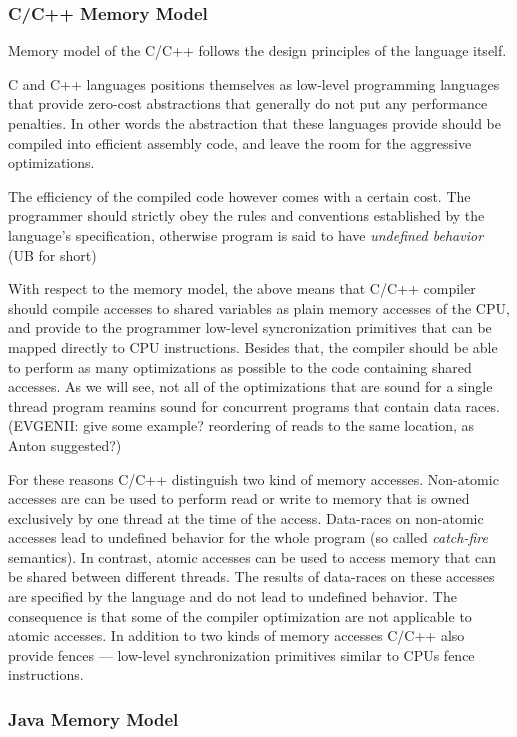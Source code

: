 \documentclass[a4paper,twoside,11pt]{article}
\numberwithin{equation}{section}
\begin{document}
\subsubsection{C/C++ Memory Model}

Memory model of the C/C++ follows the design principles of the language itself.

C and C++ languages positions themselves as low-level programming languages
that provide zero-cost abstractions that generally do not put any performance penalties. 
In other words the abstraction that these languages provide 
should be compiled into efficient assembly code,
and leave the room for the aggressive optimizations.

The efficiency of the compiled code however comes with a certain cost.
The programmer should strictly obey the rules and conventions
established by the language's specification, 
otherwise program is said to have \emph{undefined behavior} (UB for short)

With respect to the memory model, the above means that C/C++ compiler should
compile accesses to shared variables as plain memory accesses of the CPU,
and provide to the programmer low-level syncronization primitives
that can be mapped directly to CPU instructions.
Besides that, the compiler should be able to perform 
as many optimizations as possible to the code containing shared accesses.
As we will see, not all of the optimizations that are sound 
for a single thread program reamins sound for concurrent programs that contain data races. 
(EVGENII: give some example? reordering of reads to the same location, as Anton suggested?) 

For these reasons C/C++ distinguish two kind of memory accesses.
Non-atomic accesses are can be used to perform read or write to memory that 
is owned exclusively by one thread at the time of the access.
Data-races on non-atomic accesses lead to undefined behavior for the whole program
(so called \emph{catch-fire} semantics).
In contrast, atomic accesses can be used to access memory that can be shared between different threads. 
The results of data-races on these accesses are specified by the language and do not lead to undefined behavior.
The consequence is that some of the compiler optimization are not applicable to atomic accesses.
In addition to two kinds of memory accesses C/C++ also provide fences ---
low-level synchronization primitives similar to CPUs fence instructions.

\subsubsection{Java Memory Model}
\end{document}
